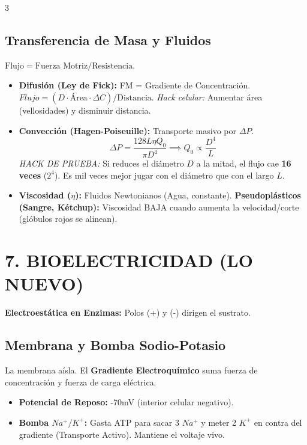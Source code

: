 \documentclass[11pt,landscape,letterpaper]{extarticle}
\begin{document}
\begin{multicols*}{3}
	\subsection{Transferencia de Masa y Fluidos}
	$\text{Flujo} = \text{Fuerza Motriz} / \text{Resistencia}$.
	\begin{itemize}
		\item \textbf{Difusión (Ley de Fick):} FM = Gradiente de Concentración. $Flujo = (D \cdot \text{Área} \cdot \Delta C) / \text{Distancia}$. \textit{Hack celular:} Aumentar área (vellosidades) y disminuir distancia.
		\item \textbf{Convección (Hagen-Poiseuille):} Transporte masivo por $\Delta P$.
		      \[ \Delta P = \frac{128 L \eta Q_0}{\pi D^4} \implies Q_0 \propto \frac{D^4}{L} \]
		      \textit{HACK DE PRUEBA:} Si reduces el diámetro $D$ a la mitad, el flujo cae \textbf{16 veces} ($2^4$). Es mil veces mejor jugar con el diámetro que con el largo $L$.
		\item \textbf{Viscosidad ($\eta$):} Fluidos Newtonianos (Agua, constante). \textbf{Pseudoplásticos (Sangre, Kétchup):} Viscosidad BAJA cuando aumenta la velocidad/corte (glóbulos rojos se alinean).
	\end{itemize}

	\columnbreak %

	\section{7. BIOELECTRICIDAD (LO NUEVO)}
	\textbf{Electroestática en Enzimas:} Polos (+) y (-) dirigen el sustrato.

	\subsection{Membrana y Bomba Sodio-Potasio}
	La membrana aísla. El \textbf{Gradiente Electroquímico} suma fuerza de concentración y fuerza de carga eléctrica.
	\begin{itemize}
		\item \textbf{Potencial de Reposo:} -70mV (interior celular negativo).
		\item \textbf{Bomba $Na^+/K^+$:} Gasta ATP para sacar 3 $Na^+$ y meter 2 $K^+$ en contra del gradiente (Transporte Activo). Mantiene el voltaje vivo.
	\end{itemize}


\end{multicols*}
\end{document}
